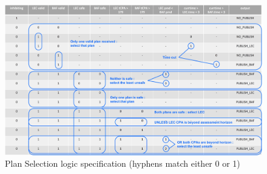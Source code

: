 
\begin{figure}
	\centering
	\includegraphics[width=\textwidth]{figures/selection-logic.jpg}
	\caption{Plan Selection logic specification (hyphens match either 0 or 1)}
	\label{fig:selection-logic}
\end{figure}